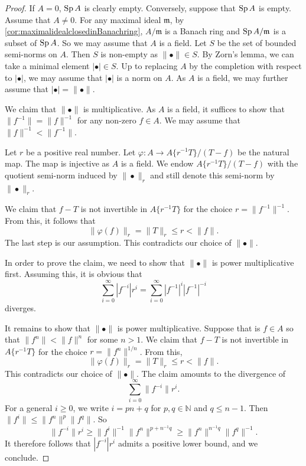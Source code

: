 \begin{proof}
    If $A=0$, $\operatorname{Sp} A$ is clearly empty. Conversely, suppose that $\operatorname{Sp} A$ is empty. Assume that $A\neq 0$. For any maximal ideal $\mathfrak{m}$, by \cref{cor:maximalidealclosedinBanachring}, $A/\mathfrak{m}$ is a Banach ring and $\operatorname{Sp} A/\mathfrak{m}$ is a subset of $\operatorname{Sp} A$. So we may assume that $A$ is a field. Let $S$ be the set of bounded semi-norms on $A$. Then $S$ is non-empty as $\|\bullet\|\in S$. By Zorn's lemma, we can take a minimal element $|\bullet|\in S$. Up to replacing $A$ by the completion with respect to $|\bullet|$, we may assume that $|\bullet |$ is a norm on $A$. As $A$ is a field, we may further assume that $|\bullet|=\|\bullet\|$.
    
    We claim that $\|\bullet\|$ is multiplicative. As $A$ is a field, it suffices to show that $\|f^{-1}\|=\|f\|^{-1}$ for any non-zero $f\in A$. We may assume that $\|f\|^{-1}<\|f^{-1}\|$.
    
    Let $r$ be a positive real number. Let $\varphi:A\rightarrow A\{r^{-1}T\}/(T-f)$ be the natural map. The map is injective as $A$ is a field. We endow $A\{r^{-1}T\}/(T-f)$ with the quotient semi-norm induced by $\|\bullet\|_r$ and still denote this semi-norm by $\|\bullet\|_r$.

    We claim that $f-T$ is not invertible in $A\{r^{-1}T\}$ for the choice $r=\|f^{-1}\|^{-1}$. From this, it follows that 
    \[
        \|\varphi(f)\|_r  =\|T\|_r\leq r <\|f\|.
    \]
    The last step is our assumption. This contradicts our choice of $\|\bullet\|$.
    
    In order to prove the claim, we need to show that $\|\bullet\|$ is power multiplicative first. Assuming this, it is obvious that 
    \[
        \sum_{i=0}^{\infty}|f^{-i}|r^i=\sum_{i=0}^{\infty}|f^{-1}|^{i}|f^{-1}|^{-i}
    \]
    diverges.
    
    It remains to show that $\|\bullet\|$ is power multiplicative.
    Suppose that is $f\in A$ so that $\|f^n\|<\|f\|^n$ for some $n>1$. We claim that $f-T$ is not invertible in $A\{r^{-1}T\}$  for the choice $r=\|f^{n}\|^{1/n}$. From this,
    \[
      \|\varphi(f)\|_r=\|T\|_r\leq r<\|f\|.  
    \]
    This contradicts our choice of $\|\bullet\|$. The claim amounts to the divergence of
    \[
        \sum_{i=0}^{\infty}\|f^{-i}\|r^i.
    \]
    For a general $i\geq 0$, we write $i=pn+q$ for $p,q\in \mathbb{N}$ and $q\leq n-1$. Then $\|f^i\|\leq \|f^n\|^p \|f^q\|$. So 
    \[
        \|f^{-i}\|r^i\geq \|f^i\|^{-1} \|f^n\|^{p+n^{-1}q}\geq \|f^n\|^{n^{-1}q}\|f^q\|^{-1}.  
    \]
    It therefore follows that $|f^{-i}|r^i$ admits a positive lower bound, and we conclude.
\end{proof}


